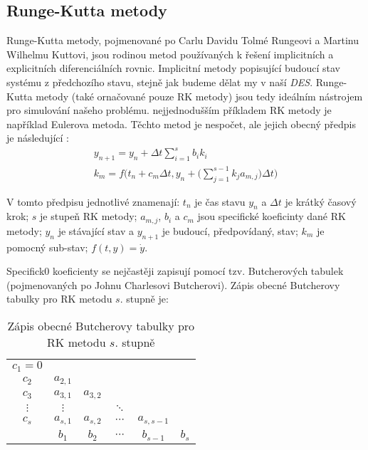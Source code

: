 \documentclass[12pt, a4paper,
 twoside,        %
 openright
]{report}
\begin{document}
\subsection{Runge-Kutta metody}

Runge-Kutta metody, pojmenované po Carlu Davidu Tolmé Rungeovi a Martinu Wilhelmu Kuttovi, jsou rodinou metod používaných k řešení implicitních a explicitních diferenciálních rovnic. Implicitní metody popisující budoucí stav systému z předchozího stavu, stejně jak budeme dělat my v naší \textit{DES}. Runge-Kutta metody (také ornačované pouze RK metody) jsou tedy ideálním nástrojem pro simulování našeho problému. nejjednodušším příkladem RK metody je například Eulerova metoda. Těchto metod je nespočet, ale jejich obecný předpis je následující \cite{RK_def}:
\begin{equation}
    \label{eq:RK_def}
    \begin{gathered}
        y_{n+1} = y_n + \Delta t \sum_{i=1}^{s} b_i k_i \\
        k_m = f \Bigg(t_n + c_m \Delta t, y_n + \Bigg(\sum_{j=1}^{s-1} k_j a_{m,j} \Bigg) \Delta t \Bigg)
    \end{gathered}
\end{equation}

V tomto předpisu jednotlivé znamenají: $t_n$ je čas stavu $y_n$ a $\Delta t$ je krátký časový krok; $s$ je stupeň RK metody; $a_{m,j}$, $b_i$ a $c_m$ jsou specifické koeficinty dané RK metody; $y_n$ je stávající stav a $y_{n+1}$ je budoucí, předpovídaný, stav; $k_m$ je pomocný sub-stav; $f(t,y) = \dot{y}$.

Specifick0 koeficienty se nejčastěji zapisují pomocí tzv. Butcherových tabulek \cite{Butcher_tab_def} (pojmenovaných po Johnu Charlesovi Butcherovi). Zápis obecné Butcherovy tabulky pro RK metodu $s$. stupně je:
\begin{table}[!ht]
    \centering
    \captionsetup{singlelinecheck=off}
    \caption{Zápis obecné Butcherovy tabulky pro RK metodu $s$. stupně}
    \label{tab:Butch_tab}

    \begin{tabularx}{7cm}{c | c c c c c}
        $c_1 = 0$                                                            \\
        $c_2$    & $a_{2, 1}$                                                \\
        $c_3$    & $a_{3, 1}$ & $a_{3, 2}$                                   \\
        $\vdots$ & $\vdots$   &            & $\ddots$                        \\
        $c_s$    & $a_{s, 1}$ & $a_{s, 2}$ & $\cdots$ & $a_{s, s-1}$         \\
        \hline
                 & $b_1$      & $b_2$      & $\cdots$ & $b_{s-1}$    & $b_s$ \\
    \end{tabularx}
\end{table}
\end{document}
